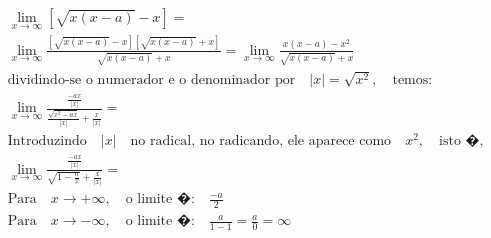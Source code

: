 \begin{ex}
\begin{align}
&\lim_{x\rightarrow \infty} [\sqrt{x(x-a)}-x]=\nonumber\\
&\lim_{x\rightarrow \infty} \frac{[\sqrt{x(x-a)}-x][\sqrt{x(x-a)}+x]}{\sqrt{x(x-a)}+x}=\lim_{x\rightarrow \infty}\frac{x(x-a)-x^2}{\sqrt{x(x-a)}+x}\nonumber\\
&\text{dividindo-se o numerador e o denominador por}\quad\left|x\right|=\sqrt{x^2},\quad\text{temos:}\nonumber\\
&\lim_{x\rightarrow \infty} \frac{\frac{-ax}{\left|x\right|}}{\frac{\sqrt{x^2-ax}}{\left|x\right|}+\frac{x}{\left|x\right|}}=\nonumber\\
&\text{Introduzindo}\quad\left|x\right|\quad\text{no radical, no radicando, ele aparece como}\quad{x^2},\quad\text{isto �,}\nonumber\\
&\lim_{x\rightarrow \infty} \frac{\frac{-ax}{\left|x\right|}}{{\sqrt{1-\frac{a}{x}}}+\frac{x}{\left|x\right|}}=\nonumber\\
&\text{Para}\quad{x\rightarrow +\infty},\quad\text{o limite �:}\quad{\frac{-a}{2}}\nonumber\\
&\text{Para}\quad{x\rightarrow -\infty},\quad\text{o limite �:}\quad{\frac{a}{1-1}=\frac{a}{0}}=\infty\nonumber
\end{align}
\end{ex}

